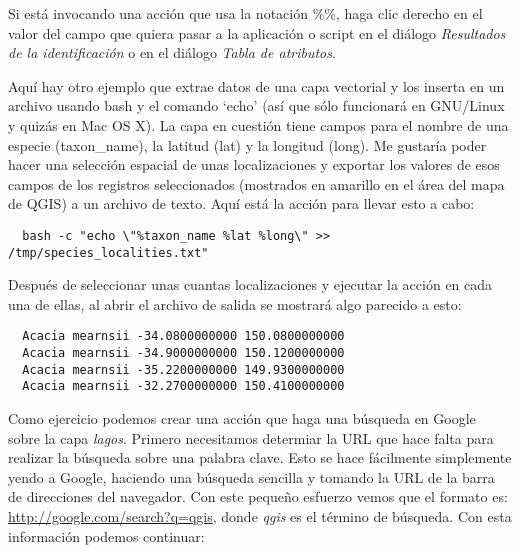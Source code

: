 Si está invocando una acción que usa la notación \%\%, haga clic derecho en el valor del campo que quiera pasar a la aplicación o script en el diálogo \textit{Resultados de la identificación} o en el diálogo \textit{Tabla de atributos}.

Aquí hay otro ejemplo que extrae datos de una capa vectorial y los inserta en un archivo usando bash y el comando `echo' (así que sólo funcionará en GNU/Linux y quizás en Mac OS X). La capa en cuestión tiene campos para el nombre de una especie (taxon\_name), la latitud (lat) y la longitud (long). Me gustaría poder hacer una selección espacial de unas localizaciones y exportar los valores de esos campos de los registros seleccionados (mostrados en amarillo en el área del mapa de QGIS) a un archivo de texto. Aquí está la acción para llevar esto a cabo:

\begin{verbatim}
  bash -c "echo \"%taxon_name %lat %long\" >> /tmp/species_localities.txt"
\end{verbatim} 

Después de seleccionar unas cuantas localizaciones y ejecutar la acción en cada una de ellas, al abrir el archivo de salida se mostrará algo parecido a esto:

\begin{verbatim}
  Acacia mearnsii -34.0800000000 150.0800000000
  Acacia mearnsii -34.9000000000 150.1200000000
  Acacia mearnsii -35.2200000000 149.9300000000
  Acacia mearnsii -32.2700000000 150.4100000000
\end{verbatim} 

Como ejercicio podemos crear una acción que haga una búsqueda en Google sobre la capa \textsl{lagos}. Primero necesitamos determiar la URL que hace falta para realizar la búsqueda sobre una palabra clave. Esto se hace fácilmente simplemente yendo a Google, haciendo una búsqueda sencilla y tomando la URL de la barra de direcciones del navegador. Con este pequeño esfuerzo vemos que el formato es: \url{http://google.com/search?q=qgis}, donde \textit{qgis} es el término de búsqueda. Con esta información podemos continuar:

